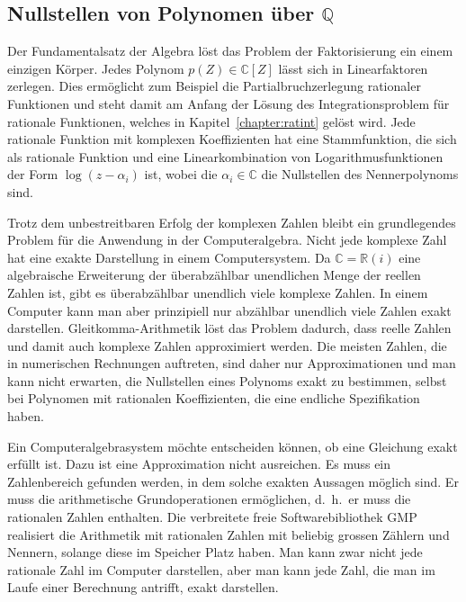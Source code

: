 %
%
%
\subsection{Nullstellen von Polynomen über $\mathbb{Q}$}
Der Fundamentalsatz der Algebra löst das Problem der Faktorisierung
ein einem einzigen Körper.
Jedes Polynom $p(Z)\in \mathbb{C}[Z]$ lässt sich in Linearfaktoren
zerlegen.
Dies ermöglicht zum Beispiel die Partialbruchzerlegung rationaler
Funktionen und steht damit am Anfang der Lösung des Integrationsproblem
für rationale Funktionen, welches in Kapitel~\ref{chapter:ratint}
gelöst wird.
%
Jede rationale Funktion mit komplexen Koeffizienten hat eine
Stammfunktion, die sich als rationale Funktion und eine Linearkombination
von Logarithmusfunktionen der Form $\log(z-\alpha_i)$ ist, wobei die
$\alpha_i\in\mathbb{C}$ die Nullstellen des Nennerpolynoms sind.

Trotz dem unbestreitbaren Erfolg der komplexen Zahlen bleibt ein
grundlegendes Problem für die Anwendung in der Computeralgebra.
%
Nicht jede komplexe Zahl hat eine exakte Darstellung in einem Computersystem.
Da $\mathbb{C}=\mathbb{R}(i)$ eine algebraische Erweiterung der 
überabzählbar unendlichen Menge der reellen Zahlen ist, gibt es
überabzählbar unendlich viele komplexe Zahlen.
In einem Computer kann man aber prinzipiell nur abzählbar unendlich
viele Zahlen exakt darstellen.
Gleitkomma-Arithmetik löst das Problem dadurch, dass reelle Zahlen
%
und damit auch komplexe Zahlen approximiert werden.
Die meisten Zahlen, die in numerischen Rechnungen auftreten, sind
daher nur Approximationen und man kann nicht erwarten, die Nullstellen
eines Polynoms exakt zu bestimmen, selbst bei Polynomen mit
rationalen Koeffizienten, die eine endliche Spezifikation haben.

Ein Computeralgebrasystem möchte entscheiden können, ob eine Gleichung
exakt erfüllt ist.
Dazu ist eine Approximation nicht ausreichen.
Es muss ein Zahlenbereich gefunden werden, in dem solche exakten Aussagen
möglich sind.
Er muss die arithmetische Grundoperationen ermöglichen, d.~h.~er muss
die rationalen Zahlen enthalten.
Die verbreitete freie Softwarebibliothek GMP \cite{buch:gmp} realisiert
%
die Arithmetik mit rationalen Zahlen mit beliebig grossen Zählern und
Nennern, solange diese im Speicher Platz haben.
Man kann zwar nicht jede rationale Zahl im Computer darstellen, aber
man kann jede Zahl, die man im Laufe einer Berechnung antrifft, exakt
darstellen.

